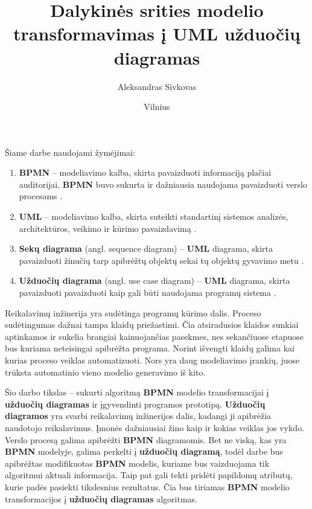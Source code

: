 \documentclass{VUMIFInfBakalaurinis}
\title{Dalykinės srities modelio transformavimas į UML užduočių diagramas}
\author{Aleksandras Sivkovas}
\date{Vilnius \\ \the\year}
\begin{document}
\maketitle

\tableofcontents

Šiame darbe naudojami žymėjimai:
\begin{enumerate}
	\item \textbf{BPMN} – modeliavimo kalba, skirta pavaizduoti informaciją plačiai auditorijai. \textbf{BPMN} buvo sukurta ir dažniausia naudojama pavaizduoti verslo procesams \cite{bpmnFormal}.
	\item \textbf{UML} – modeliavimo kalba, skirta suteikti standartinį sistemos analizės, architektūros, veikimo ir kūrimo pavaizdavimą \cite{omgUmlFormal}.
	\item \textbf{Sekų diagrama} (angl. sequence diagram) – \textbf{UML} diagrama, skirta pavaizduoti žinučių tarp apibrėžtų objektų sekai tų objektų gyvavimo metu \cite{omgUmlFormal}.
	\item \textbf{Užduočių diagrama} (angl. use case diagram) – \textbf{UML} diagrama, skirta pavaizduoti pavaizduoti kaip gali būti naudojama programų sistema \cite{algUseCasesFromBpmn}.
\end{enumerate}



Reikalavimų inžinerija yra sudėtinga programų kūrimo dalis. Proceso sudėtingumas dažnai tampa klaidų priežastimi. Čia atsiradusios klaidos sunkiai aptinkamos ir sukelia brangiai kainuojančias pasekmes, nes sekančiuose etapuose bus kuriama neteisingai apibrėžta programa. Norint išvengti klaidų galima kai kurias proceso veiklas automatizuoti. Nors yra daug modeliavimo įrankių, juose trūksta automatinio vieno modelio generavimo iš kito.

Šio darbo tikslas – sukurti algoritmą \textbf{BPMN} modelio transformacijai į \textbf{užduočių diagramas} ir įgyvendinti programos prototipą. \textbf{Užduočių diagramos} yra svarbi reikalavimų inžinerijos dalis, kadangi ji apibrėžia naudotojo reikalavimus. Įmonės dažniausiai žino kaip ir kokias veiklas jos vykdo. Verslo procesą galima apibrėžti \textbf{BPMN} diagramomis. Bet ne viską, kas yra \textbf{BPMN} modelyje, galima perkelti į \textbf{užduočių diagramą}, todėl darbe bus apibrėžtas modifikuotas \textbf{BPMN} modelis, kuriame bus vaizduojama tik algoritmui aktuali informacija. Taip pat gali tekti pridėti papildomų atributų, kurie padės pasiekti tikslesnius rezultatus. Čia bus tiriamas \textbf{BPMN} modelio transformacijos į \textbf{užduočių diagramas} algoritmas.
\end{document}
